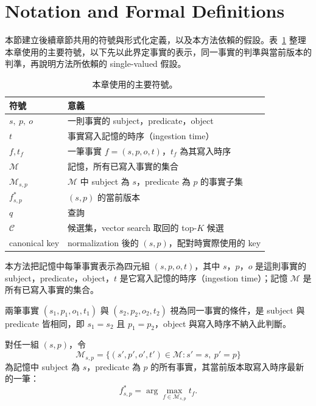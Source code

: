 \section{Notation and Formal Definitions}
\label{sec:notation}
本節建立後續章節共用的符號與形式化定義，以及本方法依賴的假設。表~\ref{tab:notation} 整理本章使用的主要符號，以下先以此界定事實的表示，同一事實的判準與當前版本的判準，再說明方法所依賴的 single-valued 假設。
 
\begin{table}[!htb]
\centering
\caption{本章使用的主要符號。}
\label{tab:notation}
\small
\begin{tabularx}{\linewidth}{lX}
\toprule
符號 & 意義 \\
\midrule
$s,\ p,\ o$ & 一則事實的 subject，predicate，object \\
$t$ & 事實寫入記憶的時序（ingestion time）\\
$f, t_f$ & 一筆事實 $f=(s,p,o,t)$，$t_f$ 為其寫入時序 \\
$\mathcal{M}$ & 記憶，所有已寫入事實的集合 \\
$\mathcal{M}_{s,p}$ & $\mathcal{M}$ 中 subject 為 $s$，predicate 為 $p$ 的事實子集 \\
$f^{*}_{s,p}$ & $(s,p)$ 的當前版本 \\
$q$ & 查詢 \\
$\mathcal{C}$ & 候選集，vector search 取回的 top-$K$ 候選 \\
canonical key & normalization 後的 $(s,p)$，配對時實際使用的 key \\
\bottomrule
\end{tabularx}
\end{table}
 
本方法把記憶中每筆事實表示為四元組 $(s, p, o, t)$，其中 $s$，$p$，$o$ 是這則事實的 subject，predicate，object，$t$ 是它寫入記憶的時序（ingestion time）；記憶 $\mathcal{M}$ 是所有已寫入事實的集合。
 
兩筆事實 $(s_1, p_1, o_1, t_1)$ 與 $(s_2, p_2, o_2, t_2)$ 視為同一事實的條件，是 subject 與 predicate 皆相同，即 $s_1 = s_2$ 且 $p_1 = p_2$，object 與寫入時序不納入此判斷。
 
對任一組 $(s, p)$，令
\[
\mathcal{M}_{s,p} = \{(s', p', o', t') \in \mathcal{M} : s' = s,\ p' = p\}
\]
為記憶中 subject 為 $s$，predicate 為 $p$ 的所有事實，其當前版本取寫入時序最新的一筆：
\begin{equation}
\label{eq:current}
f^{*}_{s,p} = \arg\max_{f \in \mathcal{M}_{s,p}} t_f.
\end{equation}
 
